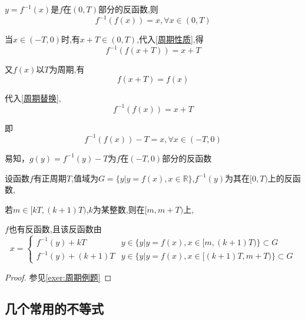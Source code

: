 \begin{solution}   \label{周期证明}

    $y=f^{-1}(x)$是$f$在$(0,T)$部分的反函数,则
    \begin{equation}
        f^{-1}(f(x))=x,\forall x \in (0,T) \label{周期性质}
    \end{equation}

    当$x \in (-T,0)$时,有$x+T\in (0,T)$,代入\cref{周期性质},得
    \begin{equation}
        f^{-1}(f(x+T))=x+T  \label{周期替换}
    \end{equation}

    又$f(x)$以$T$为周期,有
    \begin{equation}
        f(x+T)=f(x)
    \end{equation}

    代入\cref{周期替换},
    \begin{equation*}
        f^{-1}(f(x))=x+T
    \end{equation*}

    即
    \begin{equation*}
        f^{-1}(f(x))-T=x,\forall x \in (-T,0)
    \end{equation*}

    易知，$g(y)=f^{-1}(y)-T$为$f$在$(-T,0)$部分的反函数

\end{solution}

\begin{theorem}[反函数周期偏移]
    设函数$f$有正周期$T$,值域为$G=\{y|y=f(x),x \in \mathbb{R}\}$,$f^{-1}(y)$为其在$[0,T)$上的反函数,

    若$m\in [kT,(k+1)T)$,$k$为某整数,则在$[m,m+T)$上,

    $f$也有反函数,且该反函数由
    \begin{equation}
        x = \begin{cases}
            f^{-1}(y)+kT     & y\in \{y|y=f(x),x\in [m,(k+1)T)\}\subset G   \\
            f^{-1}(y)+(k+1)T & y\in \{y|y=f(x),x\in [(k+1)T,m+T)\}\subset G
        \end{cases}
    \end{equation}
\end{theorem}

\begin{proof}

    参见\cref{exer:周期例题}
\end{proof}

\subsection{几个常用的不等式}

